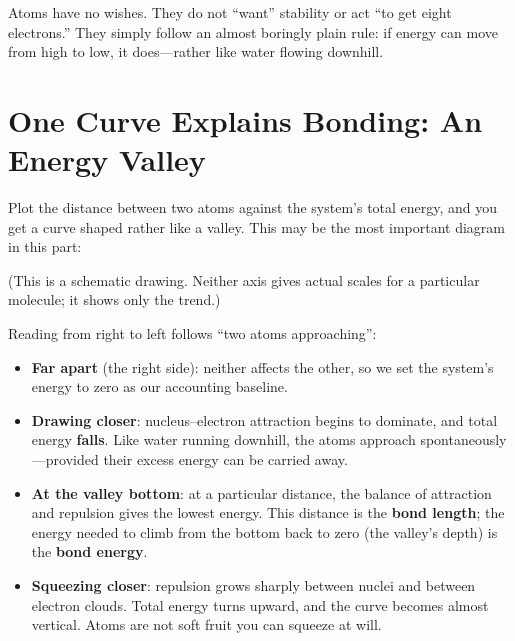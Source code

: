 Atoms have no wishes. They do not ``want'' stability or act ``to get eight electrons.'' They simply follow an almost boringly plain rule: if energy can move from high to low, it does---rather like water flowing downhill.

\section{One Curve Explains Bonding: An Energy Valley}

Plot the distance between two atoms against the system's total energy, and you get a curve shaped rather like a valley. This may be the most important diagram in this part:

\begin{center}
\end{center}

(This is a schematic drawing. Neither axis gives actual scales for a particular molecule; it shows only the trend.)

Reading from right to left follows ``two atoms approaching'':

\begin{itemize}[itemsep=2pt]
\item \textbf{Far apart} (the right side): neither affects the other, so we set the system's energy to zero as our accounting baseline.
\item \textbf{Drawing closer}: nucleus--electron attraction begins to dominate, and total energy \textbf{falls}. Like water running downhill, the atoms approach spontaneously---provided their excess energy can be carried away.
\item \textbf{At the valley bottom}: at a particular distance, the balance of attraction and repulsion gives the lowest energy. This distance is the \textbf{bond length}; the energy needed to climb from the bottom back to zero (the valley's depth) is the \textbf{bond energy}.
\item \textbf{Squeezing closer}: repulsion grows sharply between nuclei and between electron clouds. Total energy turns upward, and the curve becomes almost vertical. Atoms are not soft fruit you can squeeze at will.
\end{itemize}

